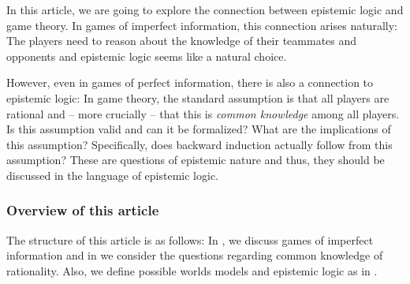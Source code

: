 In this article, we are going to explore the connection between epistemic logic and game theory. In games of imperfect information, this connection arises naturally: The players need to reason about the knowledge of their teammates and opponents and epistemic logic seems like a natural choice.

However, even in games of perfect information, there is also a connection to epistemic logic: In game theory, the standard assumption is that all players are rational and -- more crucially -- that this is \emph{common knowledge} among all players. Is this assumption valid and can it be formalized? What are the implications of this assumption? Specifically, does backward induction actually follow from this assumption? These are questions of epistemic nature and thus, they should be discussed in the language of epistemic logic.

\subsubsection*{Overview of this article}

The structure of this article is as follows: In , we discuss games of imperfect information and in  we consider the questions regarding common knowledge of rationality. Also, we define possible worlds models and epistemic logic as in \cite{fagin1995a}.